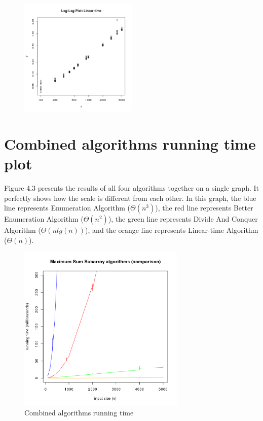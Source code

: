 \documentclass[11pt]{scrreprt}
\begin{document}
\begin{figure}
{		\includegraphics[width=0.50\textwidth]{loglog_linear_time.png}%
	}%
\end{figure}


\section{Combined algorithms running time plot}

Figure 4.3 presents the results of all four algorithms together on a single graph. It perfectly shows how the scale is different from each other. In this graph, the blue line represents Enumeration Algorithm ($\Theta(n^3)$), the red line represents Better Enumeration Algorithm ($\Theta(n^2)$), the green line represents Divide And Conquer Algorithm ($\Theta(nlg(n))$), and the orange line represents Linear-time Algorithm ($\Theta(n)$).

\begin{figure}[!htb]
\centering
\includegraphics[width=8cm]{combined.png}
\caption{Combined algorithms running time}
\label{figc1}
\end{figure}
\end{document}
